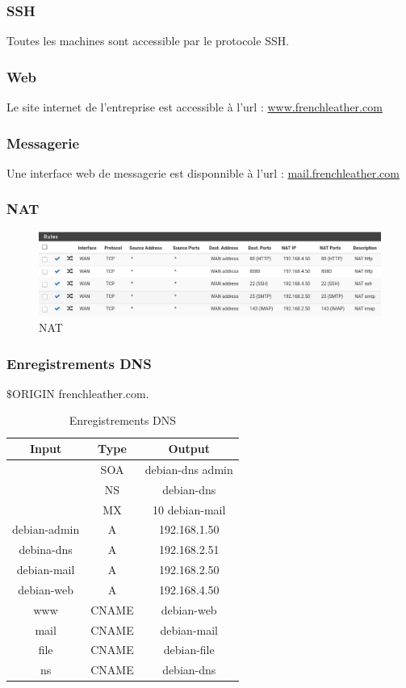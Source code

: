 \documentclass{beamer}
\begin{document}
		\begin{frame}
			\frametitle{SSH}
			Toutes les machines sont accessible par le protocole SSH.
		\end{frame}
		\begin{frame}
			\frametitle{Web}
			Le site internet de l'entreprise est accessible à l'url : \url{www.frenchleather.com}
		\end{frame}
		\begin{frame}
			\frametitle{Messagerie}
			Une interface web de messagerie est disponnible à l'url : \url{mail.frenchleather.com}
		\end{frame}
		\begin{frame}
			\frametitle{NAT}
			\begin{center}
				\begin{figure}
					\includegraphics[scale=.3]{nat.png}
					\caption{NAT}
				\end{figure}
			\end{center}
		\end{frame}
		\begin{frame}
			\frametitle{Enregistrements DNS}
			$\$$ORIGIN frenchleather.com.
			\begin{center}
				\begin{table}[h!]
					\centering
					\begin{tabular}{||c c c||}
						\hline
						Input & Type & Output \\
						\hline\hline
						 & SOA & debian-dns admin \\
						 & NS & debian-dns \\
						 & MX & 10 debian-mail \\
						debian-admin & A & 192.168.1.50 \\
						debina-dns & A & 192.168.2.51 \\
						debian-mail & A & 192.168.2.50 \\
						debian-web & A & 192.168.4.50 \\
						www & CNAME & debian-web \\
						mail & CNAME & debian-mail \\
						file & CNAME & debian-file \\
						ns & CNAME & debian-dns \\
						\hline
					\end{tabular}
					\caption{Enregistrements DNS}
					\label{table:1}
					\end{table}
			\end{center}
		\end{frame}
\end{document}
